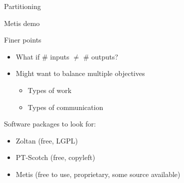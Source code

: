 \documentclass[english,compress]{beamer}
\begin{document}
\begin{frame}{Partitioning}
  \begin{center}
  \Huge Metis demo
  \end{center}
\end{frame}
\begin{frame}{Finer points}
  \begin{itemize}
    \item What if \# inputs $\ne$ \# outputs? 
    \item Might want to balance multiple objectives
      \begin{itemize}
        \item Types of work
        \item Types of communication
      \end{itemize}
  \end{itemize}

  \bigskip
  Software packages to look for:
  \begin{itemize}
    \item Zoltan (free, LGPL)
    \item PT-Scotch (free, copyleft)
    \item Metis (free to use, proprietary, some source available)
  \end{itemize}
\end{frame}
\end{document}
